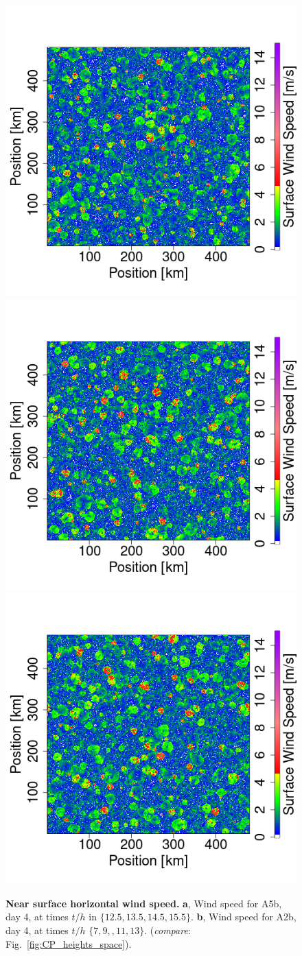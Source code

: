 \documentclass{article}
\begin{document}
\begin{figure}[ht]
\includegraphics[trim={2.5cm 0 2.6cm 0},clip,height=.3\linewidth]{T0_300K_ampl_4_1km_865-1172sequence_WindSpeed_109.png}
\includegraphics[trim={2.5cm 0 2.6cm 0},clip,height=.3\linewidth]{T0_300K_ampl_4_1km_865-1172sequence_WindSpeed_133.png}
\includegraphics[trim={2.5cm 0 0 0},clip,height=.3\linewidth]{T0_300K_ampl_4_1km_865-1172sequence_WindSpeed_157.png}
\vspace{0cm}
\caption{{\bf Near surface horizontal wind speed.}
{\bf a}, Wind speed for A5b, day 4, at times $t/h$ in $\{12.5, 13.5, 14.5, 15.5\}$. 
{\bf b}, Wind speed for A2b, day 4, at times $t/h$ $\{7, 9,, 11, 13\}$. ({\it compare}: Fig.~\ref{fig:CP_heights_space}).
}
\label{fig:hor_wind_speed}
\end{figure}
\end{document}

